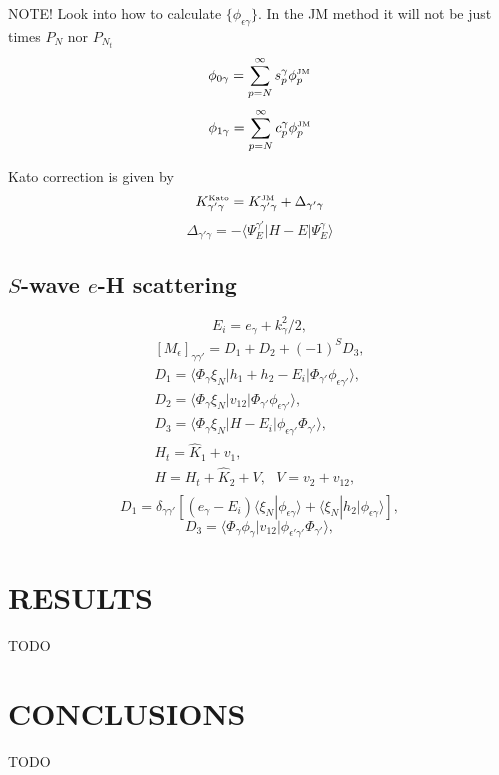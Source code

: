 \documentclass[aip
, pra
, showpacs
, aps
, twocolumn
, groupedaddress
, floatfix
]{revtex4}
\newcommand{\beq}{\begin{equation}}
\newcommand{\eeq}{\end{equation}}
\newcommand{\barr}{\begin{array}}
\newcommand{\earr}{\end{array}}
\newcommand{\JM}{\mbox{\tiny{JM}}}
\newcommand{\Kato}{\mbox{\tiny{Kato}}}
\begin{document}
NOTE! Look into how to calculate $\{ \phi_{\epsilon \gamma} \}$. In the JM method it will not be just times $P_N$ nor $P_{N_t}$
\beq
\phi_{0\gamma} = \sum_{p=N}^\infty s_p^{\gamma} \phi_p^{\JM}
\eeq
\beq
\phi_{1\gamma} = \sum_{p=N}^\infty c_p^{\gamma} \phi_p^{\JM}
\eeq

Kato correction is given by
\beq
K_{\gamma' \gamma}^{\Kato} = K_{\gamma' \gamma}^{\JM} + \Delta_{\gamma' \gamma}
\eeq
\beq
\Delta_{\gamma' \gamma} = - \langle \Psi_E^{\gamma'}  |H-E| \Psi_E^\gamma \rangle
\eeq

\subsection{$S$-wave $e$-H scattering}
\beq
E_i = e_\gamma + k^2_\gamma/2,
\eeq
\beq \barr{l}
[M_{\epsilon}]_{\gamma \gamma'} = D_1 + D_2 + (-1)^S D_3,\\
D_1 = \langle \Phi_\gamma \xi_{N}  | h_1 + h_2-E_i |
\Phi_{\gamma'} \phi_{\epsilon \gamma'} \rangle, \\
D_2 = \langle \Phi_\gamma \xi_{N}  | v_{12} |
\Phi_{\gamma'} \phi_{\epsilon \gamma'} \rangle, \\
D_3 = \langle \Phi_\gamma \xi_{N}  | H -E_i |
\phi_{\epsilon \gamma'} \Phi_{\gamma'}  \rangle, \\
H_t = \hat{K}_1 + v_1, \\
H = H_t + \hat{K}_2 + V, \ \ \ V = v_2 + v_{12},\\
\earr \label{Y_B_W} \eeq
\beq
D_1 = \delta_{\gamma \gamma'} [ (e_\gamma -  E_i)
\langle \xi_N | \phi_{\epsilon \gamma} \rangle + \langle \xi_N | h_2|\phi_{\epsilon \gamma} \rangle],
\eeq
\beq
D_3 =  \langle \Phi_\gamma \phi_{\gamma}  | v_{12}|
\phi_{\epsilon' \gamma'} \Phi_{\gamma'}  \rangle ,
\label{eH_ex} \eeq







\section{RESULTS}
TODO
\section{CONCLUSIONS}
TODO


\begin{acknowledgments}
\end{acknowledgments}





%
\end{document}
